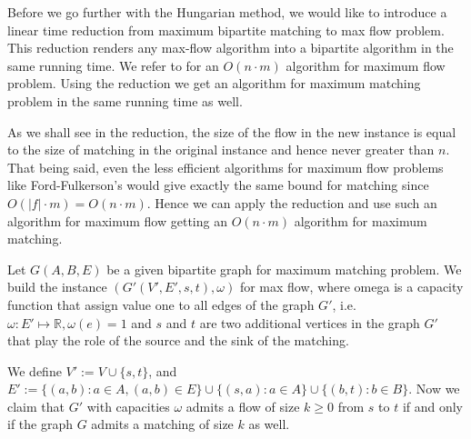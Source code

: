 Before we go further with the Hungarian method, we would like to introduce a linear time reduction from maximum bipartite matching to max flow problem. This reduction renders any max-flow algorithm into a bipartite algorithm in the same running time. We refer to \cite{orlin2013max} for an $O(n\cdot m)$ algorithm for maximum flow problem. Using the reduction we get an algorithm for maximum matching problem in the same running time as well. 

As we shall see in the reduction, the size of the flow in the new instance is equal to the size of matching in the original instance and hence never greater than $n$. That being said, even the less efficient algorithms for maximum flow problems like Ford-Fulkerson's would give exactly the same bound for matching since $O(|f|\cdot m) = O(n \cdot m)$. Hence we can apply the reduction and use such an algorithm for maximum flow getting an $O(n \cdot m)$ algorithm for maximum matching.

\begin{reduction}
	Let $G(A, B, E)$ be a given bipartite graph for maximum matching problem. We build the instance $\left(G'(V', E', s, t), \omega\right)$ for max flow, where omega is a capacity function that assign value one to all edges of the graph $G'$, i.e. $\omega:E'\mapsto \mathbb{R}, \omega(e) = 1$ and $s$ and $t$ are two additional vertices in the graph $G'$ that play the role of the source and the sink of the matching.

	We define $V' := V \cup \{s, t\}$, and $E' := \{(a, b) : a \in A, (a, b) \in E\} \cup \{ (s, a): a \in A\} \cup \{(b, t): b \in B\}$.
	Now we claim that $G'$ with capacities $\omega$ admits a flow of size $k \geq 0$ from $s$ to $t$ if and only if the graph $G$ admits a matching of size $k$ as well.
\end{reduction}

